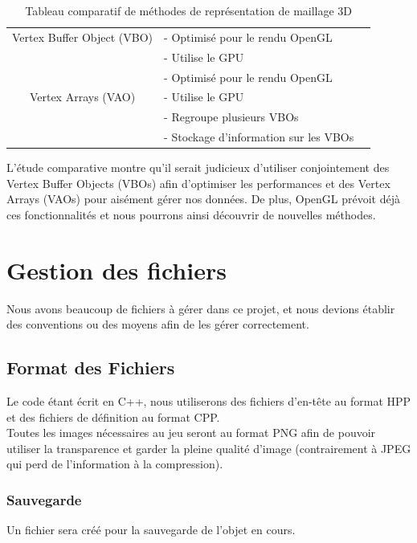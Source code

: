 \documentclass[a4paper]{memoir}
\begin{document}
\begin{table}[H]
\begin{small}
\begin{tabular}{| c | l | l |}
							\hline
							Vertex Buffer Object (VBO) & - Optimisé pour le rendu OpenGL & \\
							 & - Utilise le GPU & \\
							\hline
							 & - Optimisé pour le rendu OpenGL & \\
							Vertex Arrays (VAO) & - Utilise le GPU & \\
							 & - Regroupe plusieurs VBOs & \\
							 & - Stockage d'information sur les VBOs & \\
							\hline
						\end{tabular}
					\end{small}
					\label{tab:maillage}
					\caption{Tableau comparatif de méthodes de représentation de maillage 3D}
				\end{table}
				L'étude comparative montre qu'il serait judicieux d'utiliser conjointement des Vertex Buffer Objects (VBOs) afin d'optimiser les performances et des Vertex Arrays (VAOs) pour aisément gérer nos données. De plus, OpenGL prévoit déjà ces fonctionnalités et nous pourrons ainsi découvrir de nouvelles méthodes.
			
		\section{Gestion des fichiers}
			Nous avons beaucoup de fichiers à gérer dans ce projet, et nous devions établir des conventions ou des moyens afin de les gérer correctement.
			
			\subsection{Format des Fichiers}
				Le code étant écrit en C++, nous utiliserons des fichiers d'en-tête au format HPP et des fichiers de définition au format CPP.\\
				Toutes les images nécessaires au jeu seront au format PNG afin de pouvoir utiliser la transparence et garder la pleine qualité d'image (contrairement à JPEG qui perd de l'information à la compression).\\
			
				\subsubsection{Sauvegarde}
					Un fichier sera créé pour la sauvegarde de l'objet en cours.\\
			
\end{document}
